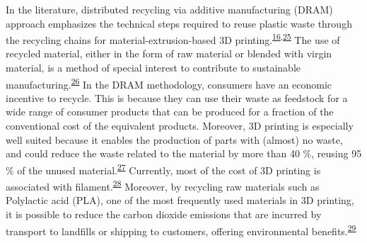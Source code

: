 \documentclass[
  12pt]{article}
\begin{document}
In the literature, distributed recycling via additive manufacturing (DRAM) approach emphasizes the technical steps required to reuse plastic waste through the recycling chains for material-extrusion-based 3D printing.\textsuperscript{\protect\hyperlink{ref-CruzSanchez2020}{16},\protect\hyperlink{ref-Little2020}{25}}
The use of recycled material, either in the form of raw material or blended with virgin material, is a method of special interest to contribute to sustainable manufacturing.\textsuperscript{\protect\hyperlink{ref-Zhao2018}{26}}
In the DRAM methodology, consumers have an economic incentive to recycle.
This is because they can use their waste as feedstock for a wide range of consumer products that can be produced for a fraction of the conventional cost of the equivalent products.
Moreover, 3D printing is especially well suited because it enables the production of parts with (almost) no waste, and could reduce the waste related to the material by more than 40 \%, reusing 95 \% of the unused material.\textsuperscript{\protect\hyperlink{ref-Petrovic2011}{27}}
Currently, most of the cost of 3D printing is associated with filament.\textsuperscript{\protect\hyperlink{ref-Wittbrodt2013}{28}}
Moreover, by recycling raw materials such as Polylactic acid (PLA), one of the most frequently used materials in 3D printing, it is possible to reduce the carbon dioxide emissions that are incurred by transport to landfills or shipping to customers, offering environmental benefits.\textsuperscript{\protect\hyperlink{ref-Santander2020}{29}}
\end{document}
